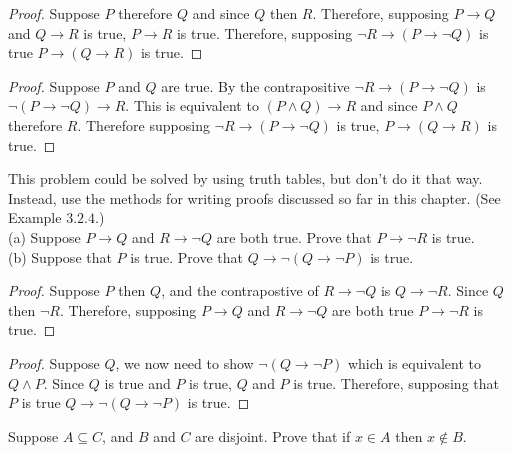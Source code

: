 \begin{proof}
    Suppose $P$ therefore $Q$ and since $Q$ then $R$. Therefore,
    supposing $P \rightarrow Q$ and $Q \rightarrow R$ is true, $P \rightarrow R$
    is true. Therefore, supposing $\neg R \rightarrow (P \rightarrow \neg Q)$ is true $P \rightarrow (Q
        \rightarrow R)$ is true.
\end{proof}

\begin{proof}
    Suppose $P$ and $Q$ are true. By the contrapositive $\neg R \rightarrow (P \rightarrow \neg Q)$
    is $\neg(P \rightarrow \neg Q) \rightarrow R$. This is equivalent to 
    $(P \wedge Q) \rightarrow R$ and since $P \wedge Q$ therefore $R$.
    Therefore supposing $\neg R \rightarrow (P \rightarrow \neg Q)$ is true, $P \rightarrow (Q
        \rightarrow R)$ is true.
\end{proof}

\begin{tcolorbox}[title=Problem 2, breakable]
    This problem could be solved by using truth tables,
    but don’t do it that way. Instead, use the methods
    for writing proofs discussed so far in this chapter.
    (See Example $3.2.4.$) \\
    (a) Suppose $P \rightarrow  Q$ and $R \rightarrow  \neg Q$ are both true. Prove
    that $P \rightarrow  \neg R$ is true. \\
    (b) Suppose that $P$ is true. Prove that $Q \rightarrow  \neg (Q \rightarrow  \neg P)$ is
    true.
\end{tcolorbox}

\begin{proof}
    Suppose $P$ then $Q$, and the contrapostive of $R \rightarrow \neg Q$ is  
    $Q \rightarrow \neg R$. Since $Q$ then $\neg R$. Therefore, supposing 
    $P \rightarrow  Q$ and $R \rightarrow  \neg Q$ are both true $P \rightarrow  \neg R$ is true. 
\end{proof}

\begin{proof}
    Suppose $Q$, we now need to show $\neg(Q \rightarrow \neg P)$ which is equivalent to $Q \wedge P$.
    Since $Q$ is true and $P$ is true, $Q$ and $P$ is true. Therefore,
    supposing that $P$ is true  $Q \rightarrow  \neg (Q \rightarrow  \neg P)$ is
    true.
\end{proof}

\begin{tcolorbox}[title=Problem 3, breakable]
    Suppose $A \subseteq C$, and $B$ and $C$ are disjoint. Prove that
    if $x \in A$ then $x \not\in B$.
\end{tcolorbox}

